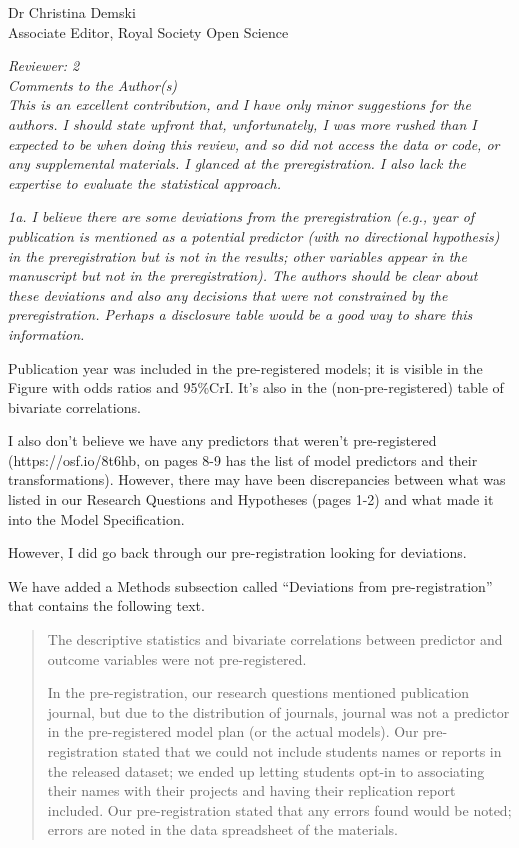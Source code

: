 \documentclass{stanfordletter}
\newcommand{\theysaid}[1]{\begin{leftbar} \noindent 
		\textsl{ #1}\end{leftbar}}
\newcommand{\revised}[1]{\begin{quote}	#1 \end{quote}}
\begin{document}
\begin{letter}{Dr Christina Demski \\ Associate Editor, Royal Society Open Science}
          
          \theysaid{Reviewer: 2\\
          	Comments to the Author(s)\\
          	This is an excellent contribution, and I have only minor suggestions for the authors. I should state upfront that, unfortunately, I was more rushed than I expected to be when doing this review, and so did not access the data or code, or any supplemental materials.  I glanced at the preregistration.  I also lack the expertise to evaluate the statistical approach.
          }
          	
          \theysaid{	1a. I believe there are some deviations from the preregistration (e.g., year of publication is mentioned as a potential predictor (with no directional hypothesis) in the preregistration but is not in the results; other variables appear in the manuscript but not in the preregistration). The authors should be clear about these deviations and also any decisions that were not constrained by the preregistration. Perhaps a disclosure table would be a good way to share this information.}
          
          Publication year was included in the pre-registered models; it is visible in the Figure with odds ratios and 95\%CrI. It's also in the (non-pre-registered) table of bivariate correlations. 
          
          I also don't believe we have any predictors that weren't pre-registered (https://osf.io/8t6hb, on pages 8-9 has the list of model predictors and their transformations). However, there may have been discrepancies between what was listed in our Research Questions and Hypotheses (pages 1-2) and what made it into the Model Specification. 
 
 
         However, I did go back through our pre-registration looking for deviations. 
         
         We have added a Methods subsection called ``Deviations from pre-registration'' that contains the following text. 
         
         \revised{
         The descriptive statistics and bivariate correlations between predictor and outcome variables were not pre-registered.
         
         
         In the pre-registration, our research questions mentioned publication journal, but due to the distribution of journals, journal was not a predictor in the pre-registered model plan (or the actual models). Our pre-registration stated that we could not include students names or reports in the released dataset; we ended up letting students opt-in to associating their names with their projects and having their replication report included. Our pre-registration stated that any errors found would be noted; errors are noted in the data spreadsheet of the materials.}
         

\end{letter}
\end{document}
